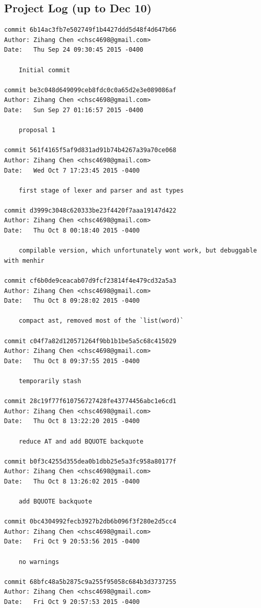 \documentclass{report}
\begin{document}
\begin{appendices}
\chapter{Project Log (up to Dec 10)}
\label{project-log}

\begin{verbatim}
commit 6b14ac3fb7e502749f1b4427ddd5d48f4d647b66
Author: Zihang Chen <chsc4698@gmail.com>
Date:   Thu Sep 24 09:30:45 2015 -0400

    Initial commit

commit be3c048d649099ceb8fdc0c0a65d2e3e089086af
Author: Zihang Chen <chsc4698@gmail.com>
Date:   Sun Sep 27 01:16:57 2015 -0400

    proposal 1

commit 561f4165f5af9d831ad91b74b4267a39a70ce068
Author: Zihang Chen <chsc4698@gmail.com>
Date:   Wed Oct 7 17:23:45 2015 -0400

    first stage of lexer and parser and ast types

commit d3999c3048c620333be23f4420f7aaa19147d422
Author: Zihang Chen <chsc4698@gmail.com>
Date:   Thu Oct 8 00:18:40 2015 -0400

    compilable version, which unfortunately wont work, but debuggable with menhir

commit cf6b0de9ceacab07d9fcf23814f4e479cd32a5a3
Author: Zihang Chen <chsc4698@gmail.com>
Date:   Thu Oct 8 09:28:02 2015 -0400

    compact ast, removed most of the `list(word)`

commit c04f7a82d120571264f9bb1b1be5a5c68c415029
Author: Zihang Chen <chsc4698@gmail.com>
Date:   Thu Oct 8 09:37:55 2015 -0400

    temporarily stash

commit 28c19f77f610756727428fe43774456abc1e6cd1
Author: Zihang Chen <chsc4698@gmail.com>
Date:   Thu Oct 8 13:22:20 2015 -0400

    reduce AT and add BQUOTE backquote

commit b0f3c4255d355dea0b1dbb25e5a3fc958a80177f
Author: Zihang Chen <chsc4698@gmail.com>
Date:   Thu Oct 8 13:26:02 2015 -0400

    add BQUOTE backquote

commit 0bc4304992fecb3927b2db6b096f3f280e2d5cc4
Author: Zihang Chen <chsc4698@gmail.com>
Date:   Fri Oct 9 20:53:56 2015 -0400

    no warnings

commit 68bfc48a5b2875c9a255f95058c684b3d3737255
Author: Zihang Chen <chsc4698@gmail.com>
Date:   Fri Oct 9 20:57:53 2015 -0400


\end{verbatim}
\end{appendices}
\end{document}
